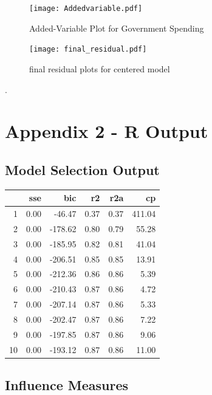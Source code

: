 \documentclass[12pt]{article}
\begin{document}
\begin{figure}
	\centering
	\texttt{[image: Addedvariable.pdf]}
	\caption{Added-Variable Plot for Government Spending}
	\label{fig:added}
\end{figure}

\begin{figure}
  \centering
    \texttt{[image: final\_residual.pdf]}
  \caption{final residual plots for centered model}
  \label{fig:final_residual}
\end{figure}



\newpage
.
\newpage

\section{Appendix 2 - R Output}

\subsection*{Model Selection Output}
\begin{table}[ht]
	\centering
	\begin{tabular}{rrrrrr}
		\hline
		& sse & bic & r2 & r2a & cp \\
		\hline
		1 & 0.00 & -46.47 & 0.37 & 0.37 & 411.04 \\
		2 & 0.00 & -178.62 & 0.80 & 0.79 & 55.28 \\
		3 & 0.00 & -185.95 & 0.82 & 0.81 & 41.04 \\
		4 & 0.00 & -206.51 & 0.85 & 0.85 & 13.91 \\
		5 & 0.00 & -212.36 & 0.86 & 0.86 & 5.39 \\
		6 & 0.00 & -210.43 & 0.87 & 0.86 & 4.72 \\
		7 & 0.00 & -207.14 & 0.87 & 0.86 & 5.33 \\
		8 & 0.00 & -202.47 & 0.87 & 0.86 & 7.22 \\
		9 & 0.00 & -197.85 & 0.87 & 0.86 & 9.06 \\
		10 & 0.00 & -193.12 & 0.87 & 0.86 & 11.00 \\
		\hline
	\end{tabular}
\end{table}

\subsection{Influence Measures}
\end{document}
